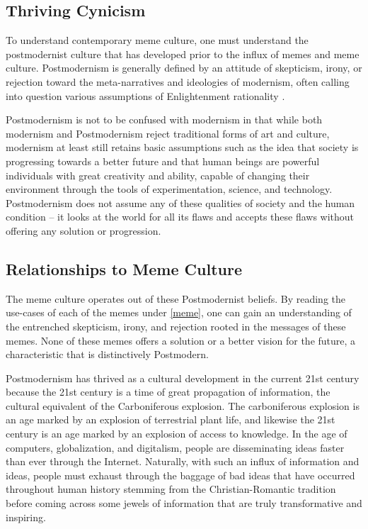 \documentclass[12pt,letterpaper]{article}
\begin{document}
\subsection{Thriving Cynicism}

To understand contemporary meme culture, one must understand the postmodernist culture that has developed prior to the influx of memes and meme culture.  Postmodernism is generally defined by an attitude of skepticism, irony, or rejection toward the meta-narratives and ideologies of modernism, often calling into question various assumptions of Enlightenment rationality \cite{}.  

Postmodernism is not to be confused with modernism in that while both modernism and Postmodernism reject traditional forms of art and culture, modernism at least still retains basic assumptions such as the idea that society is progressing towards a better future and that human beings are powerful individuals with great creativity and ability, capable of changing their environment through the tools of experimentation, science, and technology.  Postmodernism does not assume any of these qualities of society and the human condition -- it looks at the world for all its flaws and accepts these flaws without offering any solution or progression.

\subsection{Relationships to Meme Culture}

The meme culture operates out of these Postmodernist beliefs.  By reading the use-cases of each of the memes under \autoref{meme}, one can gain an understanding of the entrenched skepticism, irony, and rejection rooted in the messages of these memes.  None of these memes offers a solution or a better vision for the future, a characteristic that is distinctively Postmodern.

Postmodernism has thrived as a cultural development in the current 21st century because the 21st century is a time of great propagation of information, the cultural equivalent of the Carboniferous explosion.  The carboniferous explosion is an age marked by an explosion of terrestrial  plant life, and likewise the 21st century is an age marked by an explosion of access to knowledge.  In the age of computers,  globalization, and digitalism, people are disseminating ideas faster than ever through the Internet.  Naturally,  with such an influx of information and ideas, people must exhaust through the baggage of bad ideas that have occurred throughout human history stemming from the Christian-Romantic tradition before coming across some jewels of information that are truly transformative and inspiring.
\end{document}
